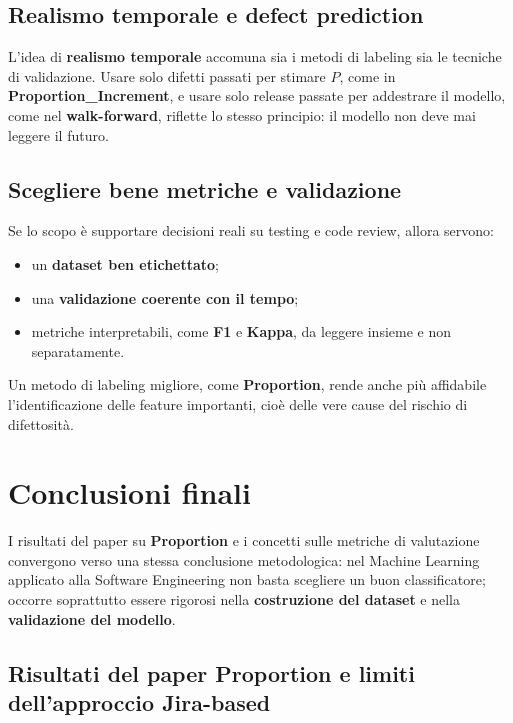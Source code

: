 \subsection{Realismo temporale e defect prediction}

L'idea di \textbf{realismo temporale} accomuna sia i metodi di labeling sia le tecniche di validazione. Usare solo difetti passati per stimare \(P\), come in \textbf{Proportion\_Increment}, e usare solo release passate per addestrare il modello, come nel \textbf{walk-forward}, riflette lo stesso principio: il modello non deve mai leggere il futuro.

\subsection{Scegliere bene metriche e validazione}

Se lo scopo è supportare decisioni reali su testing e code review, allora servono:

\begin{itemize}
    \item un \textbf{dataset ben etichettato};
    \item una \textbf{validazione coerente con il tempo};
    \item metriche interpretabili, come \textbf{F1} e \textbf{Kappa}, da leggere insieme e non separatamente.
\end{itemize}

Un metodo di labeling migliore, come \textbf{Proportion}, rende anche più affidabile l'identificazione delle feature importanti, cioè delle vere cause del rischio di difettosità.

\section{Conclusioni finali}

I risultati del paper su \textbf{Proportion} e i concetti sulle metriche di valutazione convergono verso una stessa conclusione metodologica: nel Machine Learning applicato alla Software Engineering non basta scegliere un buon classificatore; occorre soprattutto essere rigorosi nella \textbf{costruzione del dataset} e nella \textbf{validazione del modello}.

\subsection{Risultati del paper Proportion e limiti dell'approccio Jira-based}

